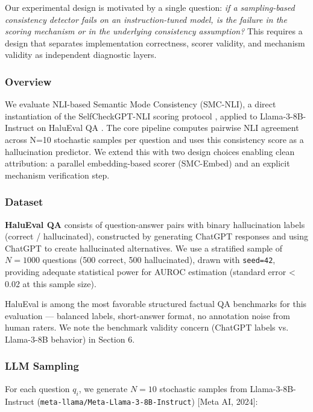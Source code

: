 
Our experimental design is motivated by a single question: \textit{if a sampling-based consistency detector fails on an instruction-tuned model, is the failure in the scoring mechanism or in the underlying consistency assumption?} This requires a design that separates implementation correctness, scorer validity, and mechanism validity as independent diagnostic layers.

\subsubsection{Overview}

We evaluate NLI-based Semantic Mode Consistency (SMC-NLI), a direct instantiation of the SelfCheckGPT-NLI scoring protocol \citep{Manakul2023SelfCheckGPT}, applied to Llama-3-8B-Instruct on HaluEval QA \citep{Li2023HaluEval}. The core pipeline computes pairwise NLI agreement across N=10 stochastic samples per question and uses this consistency score as a hallucination predictor. We extend this with two design choices enabling clean attribution: a parallel embedding-based scorer (SMC-Embed) and an explicit mechanism verification step.

\subsubsection{Dataset}

\textbf{HaluEval QA} \citep{Li2023HaluEval} consists of question-answer pairs with binary hallucination labels (correct / hallucinated), constructed by generating ChatGPT responses and using ChatGPT to create hallucinated alternatives. We use a stratified sample of $N=1000$ questions (500 correct, 500 hallucinated), drawn with \texttt{seed=42}, providing adequate statistical power for AUROC estimation (standard error < 0.02 at this sample size).

HaluEval is among the most favorable structured factual QA benchmarks for this evaluation --- balanced labels, short-answer format, no annotation noise from human raters. We note the benchmark validity concern (ChatGPT labels vs. Llama-3-8B behavior) in Section 6.

\subsubsection{LLM Sampling}

For each question $q_i$, we generate $N=10$ stochastic samples from Llama-3-8B-Instruct (\texttt{meta-llama/Meta-Llama-3-8B-Instruct}) [Meta AI, 2024]:

